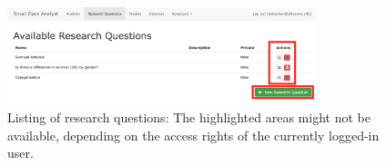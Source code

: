 \begin{figure}[htp]
\centering
\includegraphics[width=0.8\textwidth]{figures/ui_RQ}
\caption{Listing of research questions: The highlighted areas might not be available, depending on the access rights of the currently logged-in user.}
\label{fig:ui:rq}
\end{figure}


